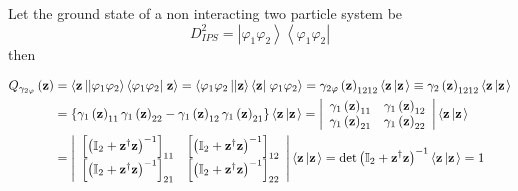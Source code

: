 \documentclass[aps,preprint]{revtex4}%
\begin{document}
Let the ground state of a non interacting two particle system be
\begin{equation}
D_{IPS}^{2}=\left\vert \varphi_{1}\varphi_{2}\right\rangle \left\langle
\varphi_{1}\varphi_{2}\right\vert
\end{equation}
then%

\begin{align}
Q_{\gamma_{2\varphi}}\left(  \mathbf{z}\right)   &  =\left\langle
\mathbf{z}\left\vert \left\vert \varphi_{1}\varphi_{2}\right\rangle
\left\langle \varphi_{1}\varphi_{2}\right\vert \right.  \mathbf{z}%
\right\rangle =\left\langle \varphi_{1}\varphi_{2}\left\vert \left\vert
\mathbf{z}\right\rangle \left\langle \mathbf{z}\right\vert \right.
\varphi_{1}\varphi_{2}\right\rangle =\gamma_{2\varphi}\left(  \mathbf{z}%
\right)  _{1212}\left\langle \mathbf{z}\left\vert \mathbf{z}\right.
\right\rangle \equiv\gamma_{2}\left(  \mathbf{z}\right)  _{1212}\left\langle
\mathbf{z}\left\vert \mathbf{z}\right.  \right\rangle \nonumber\\
&  =\left\{  \gamma_{1}\left(  \mathbf{z}\right)  _{11}\gamma_{1}\left(
\mathbf{z}\right)  _{22}-\gamma_{1}\left(  \mathbf{z}\right)  _{12}\gamma
_{1}\left(  \mathbf{z}\right)  _{21}\right\}  \left\langle \mathbf{z}%
\left\vert \mathbf{z}\right.  \right\rangle =\left\vert
\begin{array}
[c]{cc}%
\gamma_{1}\left(  \mathbf{z}\right)  _{11} & \gamma_{1}\left(  \mathbf{z}%
\right)  _{12}\\
\gamma_{1}\left(  \mathbf{z}\right)  _{21} & \gamma_{1}\left(  \mathbf{z}%
\right)  _{22}%
\end{array}
\right\vert \left\langle \mathbf{z}\left\vert \mathbf{z}\right.  \right\rangle
\nonumber\\
&  =\left\vert
\begin{array}
[c]{cc}%
\left[  \left(  \mathbb{I}_{2}+\mathbf{z}^{\dagger}\mathbf{z}\right)
^{-1}\right]  _{11} & \left[  \left(  \mathbb{I}_{2}+\mathbf{z}^{\dagger
}\mathbf{z}\right)  ^{-1}\right]  _{12}\\
\left[  \left(  \mathbb{I}_{2}+\mathbf{z}^{\dagger}\mathbf{z}\right)
^{-1}\right]  _{21} & \left[  \left(  \mathbb{I}_{2}+\mathbf{z}^{\dagger
}\mathbf{z}\right)  ^{-1}\right]  _{22}%
\end{array}
\right\vert \left\langle \mathbf{z}\left\vert \mathbf{z}\right.  \right\rangle
=\det\left(  \mathbb{I}_{2}+\mathbf{z}^{\dagger}\mathbf{z}\right)
^{-1}\left\langle \mathbf{z}\left\vert \mathbf{z}\right.  \right\rangle =1
\end{align}
\end{document}
